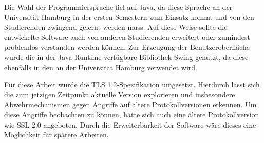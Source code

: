 Die Wahl der Programmiersprache fiel auf Java, da diese Sprache an der Universität Hamburg in der ersten Semestern zum Einsatz kommt und von den Studierenden zwingend gelernt werden muss. Auf diese Weise sollte die entwickelte Software auch von anderen Studierenden erweitert oder zumindest problemlos verstanden werden können. Zur Erzeugung der Benutzeroberfläche wurde die in der Java-Runtime verfügbare Bibliothek Swing genutzt, da diese ebenfalls in den an der Universität Hamburg verwendet wird.

Für diese Arbeit wurde die TLS 1.2-Spezifikation umgesetzt. Hierdurch lässt sich die zum jetzigen Zeitpunkt aktuelle Version explorieren und insbesondere Abwehrmechanismen gegen Angriffe auf ältere Protokollversionen erkennen. Um diese Angriffe beobachten zu können, hätte sich auch eine ältere Protokollversion wie SSL 2.0 angeboten. Durch die Erweiterbarkeit der Software wäre dieses eine Möglichkeit für spätere Arbeiten.

